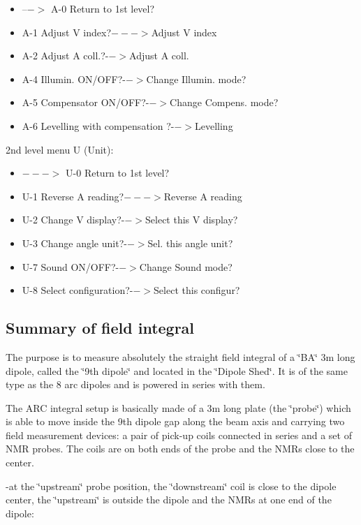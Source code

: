 \begin{itemize}
\item --$->$ A-0 Return to 1st level? 
\item A-1 Adjust V index?$--->$Adjust V index 
\item A-2 Adjust A coll.?-$->$Adjust A coll. 
\item A-4 Illumin. ON/OFF?-$->$Change Illumin. mode? 
\item A-5 Compensator ON/OFF?-$->$Change Compens. mode? 
\item A-6 Levelling with compensation ?-$->$Levelling
\end{itemize}
2nd level menu U (Unit): 

\begin{itemize}
\item $--->$ U-0 Return to 1st level? 
\item U-1 Reverse A reading?$--->$Reverse A reading 
\item U-2 Change V display?-$->$Select this V display? 
\item U-3 Change angle unit?-$->$Sel. this angle unit? 
\item U-7 Sound ON/OFF?-$->$Change Sound mode? 
\item U-8 Select configuration?-$->$Select this configur?
\end{itemize}

\subsection{Summary of field integral }

The purpose is to measure absolutely the straight field integral of a \char`\"{}BA\char`\"{}
3m long dipole, called the \char`\"{}9th dipole\char`\"{} and located in the
\char`\"{}Dipole Shed\char`\"{}. It is of the same type as the 8 arc dipoles
and is powered in series with them. 

The ARC integral setup is basically made of a 3m long plate (the \char`\"{}probe\char`\"{})
which is able to move inside the 9th dipole gap along the beam axis and carrying two
field measurement devices: a pair of pick-up coils connected in series and a
set of NMR probes. The coils are on both ends of the probe and the NMRs close
to the center. 

-at the \char`\"{}upstream\char`\"{} probe position, the \char`\"{}downstream\char`\"{}
coil is close to the dipole center, the \char`\"{}upstream\char`\"{} is outside
the dipole and the NMRs at one end of the dipole: 

